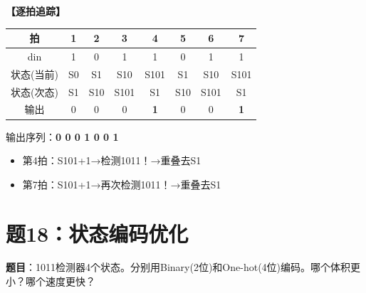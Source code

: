 \begin{solution}[完整解答]

\textbf{【逐拍追踪】}
\begin{center}
\begin{tabular}{|c|c|c|c|c|c|c|c|}\hline
拍 & 1 & 2 & 3 & 4 & 5 & 6 & 7 \\ \hline
din & 1 & 0 & 1 & 1 & 0 & 1 & 1 \\ \hline
状态(当前) & S0 & S1 & S10 & S101 & S1 & S10 & S101 \\ \hline
状态(次态) & S1 & S10 & S101 & S1 & S10 & S101 & S1 \\ \hline
输出 & 0 & 0 & 0 & \textbf{1} & 0 & 0 & \textbf{1} \\ \hline
\end{tabular}
\end{center}

输出序列：\textbf{0 0 0 1 0 0 1}

\begin{itemize}
  \item 第4拍：S101+1→检测1011！→重叠去S1
  \item 第7拍：S101+1→再次检测1011！→重叠去S1
\end{itemize}

\end{solution}


\section{题18：状态编码优化}

\textbf{题目}：1011检测器4个状态。分别用Binary(2位)和One-hot(4位)编码。哪个体积更小？哪个速度更快？

